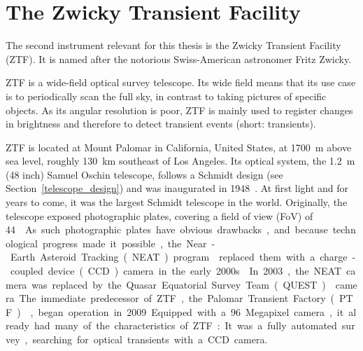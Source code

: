 \chapter{The Zwicky Transient Facility}\label{ztf}
The second instrument relevant for this thesis is the Zwicky Transient Facility (ZTF). It is named after the notorious Swiss-American astronomer Fritz Zwicky.

ZTF is a wide-field optical survey telescope. Its wide field means that its use case is to periodically scan the full sky, in contrast to taking pictures of specific objects. As its angular resolution is poor, ZTF is mainly used to register changes in brightness and therefore to detect transient events (short: transients).

ZTF is located at Mount Palomar in California, United States, at \SI{1700}{\m} above sea level, roughly \SI{130}{\km} southeast of Los Angeles. Its optical system, the \SI{1.2}{\m} (48 inch) Samuel Oschin telescope, follows a Schmidt design (see Section~\ref{telescope_design}) and was inaugurated in 1948~\cite{Harrington1952}. At first light and for years to come, it was the largest Schmidt telescope in the world. Originally, the telescope exposed photographic plates, covering a field of view (FoV) of \SI{44}{\square\deg}. As such photographic plates have obvious drawbacks, and because technological progress made it possible, the Near-Earth Asteroid Tracking (NEAT) program~ replaced them with a charge-coupled device (CCD) camera in the early 2000s.

In 2003, the NEAT camera was replaced by the Quasar Equatorial Survey Team (QUEST)~ camera. The immediate predecessor of ZTF, the Palomar Transient Factory (PTF)~, began operation in 2009. Equipped with a 96 Megapixel camera, it already had many of the characteristics of ZTF: It was a fully automated survey, searching for optical transients with a CCD camera.

